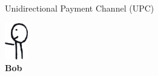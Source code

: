 \documentclass[]{beamer}
\begin{document}
\begin{frame}{Unidirectional Payment Channel (UPC)}
\begin{minipage}{0.8\linewidth}
{\begin{figure}
{\begin{tikzpicture}[scale=0.9, every node/.style={scale=0.9}]
					
			\end{tikzpicture}}
		\end{figure}}		
	\end{minipage}%
\begin{minipage}{0.1\linewidth}
	\vspace{1.2cm}
	\centering
		\includegraphics[width=1cm]{../assets/images/agents/handing_left}
		\\ \hspace{0.3cm}\textbf{Bob}
		\vspace{-0.5cm}
		\begin{figure}
		\hspace{-1.7cm}
		\resizebox{2.5cm}{!}{
				\begin{tikzpicture}[scale=0.7, every node/.style={scale=0.7}]
					
				\end{tikzpicture}}
		\end{figure}
	
\end{minipage}

\end{frame}
\end{document}
